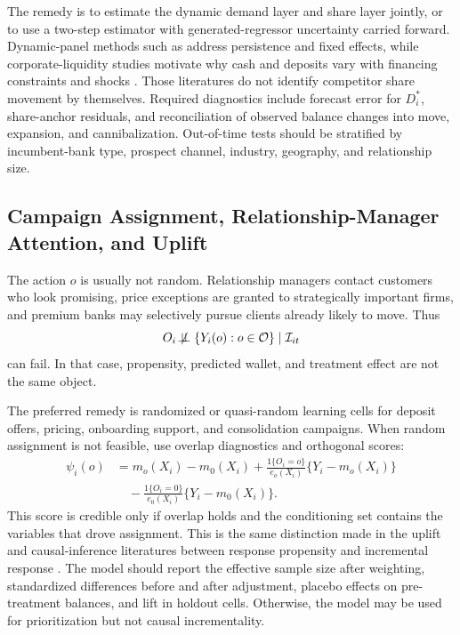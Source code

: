 \documentclass[11pt]{article}
\begin{document}
The remedy is to estimate the dynamic demand layer and share layer jointly, or
to use a two-step estimator with generated-regressor uncertainty carried
forward. Dynamic-panel methods such as \citet{arellano1991panel} address
persistence and fixed effects, while corporate-liquidity studies motivate why
cash and deposits vary with financing constraints and shocks
\citep{opler1999cash,almeida2004cash,bates2009cash}. Those literatures do not
identify competitor share movement by themselves. Required diagnostics include
forecast error for $D_i^{*}$, share-anchor residuals, and reconciliation of
observed balance changes into move, expansion, and cannibalization. Out-of-time
tests should be stratified by incumbent-bank type, prospect channel, industry,
geography, and relationship size.

\subsection{Campaign Assignment, Relationship-Manager Attention, and Uplift}

The action $o$ is usually not random. Relationship managers contact customers
who look promising, price exceptions are granted to strategically important
firms, and premium banks may selectively pursue clients already likely to move.
Thus
\[
  O_i \not\!\perp\!\!\!\perp
  \{Y_i(o):o\in\mathcal{O}\}\mid \mathcal{I}_{it}
\]
can fail. In that case, propensity, predicted wallet, and treatment effect are
not the same object.

The preferred remedy is randomized or quasi-random learning cells for deposit
offers, pricing, onboarding support, and consolidation campaigns. When random
assignment is not feasible, use overlap diagnostics and orthogonal scores:
\[
\begin{aligned}
  \psi_i(o)
  &=
  m_o(X_i)-m_0(X_i)
  +\frac{1\{O_i=o\}}{e_o(X_i)}\{Y_i-m_o(X_i)\}\\
  &\quad
  -\frac{1\{O_i=0\}}{e_0(X_i)}\{Y_i-m_0(X_i)\}.
\end{aligned}
\]
This score is credible only if overlap holds and the conditioning set contains
the variables that drove assignment. This is the same distinction made in the
uplift and causal-inference literatures between response propensity and
incremental response \citep{rosenbaum1983propensity,lo2002true,wager2018causalforests,chernozhukov2018dml}.
The model should report the effective sample size after weighting, standardized
differences before and after adjustment, placebo effects on pre-treatment
balances, and lift in holdout cells. Otherwise, the model may be used for
prioritization but not causal incrementality.
\end{document}
